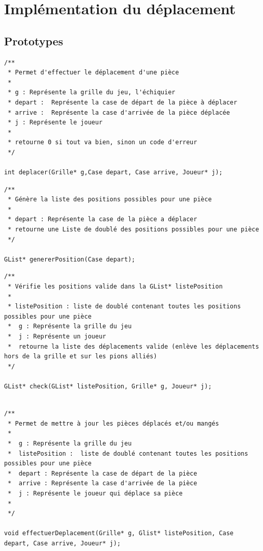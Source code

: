 \documentclass[12pt]{article}
\begin{document}
\section{Implémentation du
déplacement}\label{impluxe9mentation-du-duxe9placement}

\subsection{Prototypes}\label{prototypes}

\begin{lstlisting}
/**
 * Permet d'effectuer le déplacement d'une pièce
 * 
 * g : Représente la grille du jeu, l'échiquier
 * depart :  Représente la case de départ de la pièce à déplacer
 * arrive :  Représente la case d'arrivée de la pièce déplacée
 * j : Représente le joueur
 *
 * retourne 0 si tout va bien, sinon un code d'erreur
 */

int deplacer(Grille* g,Case depart, Case arrive, Joueur* j);
\end{lstlisting}

\begin{lstlisting}
/**
 * Génère la liste des positions possibles pour une pièce
 * 
 * depart : Représente la case de la pièce a déplacer
 * retourne une Liste de doublé des positions possibles pour une pièce
 */     

GList* genererPosition(Case depart);
\end{lstlisting}

\begin{lstlisting}
/**
 * Vérifie les positions valide dans la GList* listePosition
 * 
 * listePosition : liste de doublé contenant toutes les positions possibles pour une pièce
 *  g : Représente la grille du jeu
 *  j : Représente un joueur 
 *  retourne la liste des déplacements valide (enlève les déplacements hors de la grille et sur les pions alliés)
 */

GList* check(GList* listePosition, Grille* g, Joueur* j);
\end{lstlisting}

\begin{lstlisting}

/**
 * Permet de mettre à jour les pièces déplacés et/ou mangés
 * 
 *  g : Représente la grille du jeu 
 *  listePosition :  liste de doublé contenant toutes les positions possibles pour une pièce
 *  depart : Représente la case de départ de la pièce 
 *  arrive : Représente la case d'arrivée de la pièce 
 *  j : Représente le joueur qui déplace sa pièce
 *
 */

void effectuerDeplacement(Grille* g, Glist* listePosition, Case depart, Case arrive, Joueur* j);
\end{lstlisting}
\end{document}
